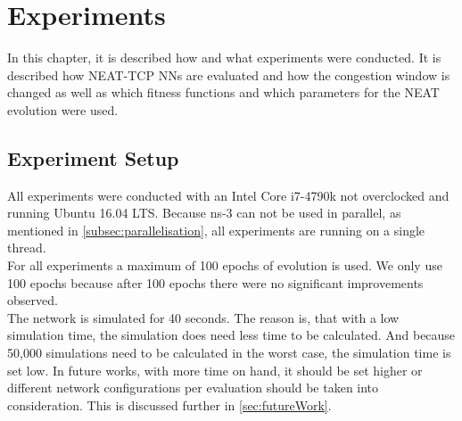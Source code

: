 \chapter{Experiments}\label{ch:experiments}
\glsresetall %
In this chapter, it is described how and what experiments were conducted. It is described how NEAT-TCP NNs are evaluated and how the congestion window is changed as well as which fitness functions and which parameters for the NEAT evolution were used.

\section{Experiment Setup}\label{sec:expsetup}
All experiments were conducted with an Intel Core i7-4790k not overclocked and running Ubuntu 16.04 LTS. Because ns-3 can not be used in parallel, as mentioned in \autoref{subsec:parallelisation}, all experiments are running on a single thread. \\
For all experiments a maximum of 100 epochs of evolution is used. We only use 100 epochs because after 100 epochs there were no significant improvements observed. \\ The network is simulated for 40 seconds. The reason is, that with a low simulation time, the simulation does need less time to be calculated. And because 50,000 simulations need to be calculated in the worst case, the simulation time is set low. In future works, with more time on hand, it should be set higher or different network configurations per evaluation should be taken into consideration. This is discussed further in \autoref{sec:futureWork}.


